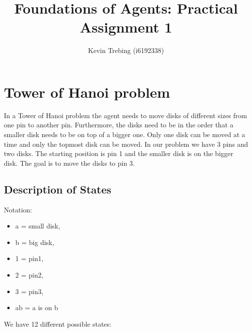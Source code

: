 \documentclass[a4paper]{article}
\title{Foundations of Agents: Practical Assignment 1}
\author{Kevin Trebing (i6192338)}
\begin{document}
\maketitle

\section{Tower of Hanoi problem}
In a Tower of Hanoi problem the agent needs to move disks of different sizes from one pin to another pin. Furthermore, the disks need to be in the order that a smaller disk needs to be on top of a bigger one. Only one disk can be moved at a time and only the topmost disk can be moved. In our problem we have 3 pins and two disks. The starting position is pin 1 and the smaller disk is on the bigger disk. The goal is to move the disks to pin 3.

\subsection{Description of States}
Notation:
\begin{multicols}{2}
\begin{itemize}

\item a = small disk,
\item b = big disk,
\item 1 = pin1,
\item 2 = pin2,
\item 3 = pin3,
\item ab = a is on b
\end{itemize}
\end{multicols}

\noindent
We have 12 different possible states: \\
\end{document}
